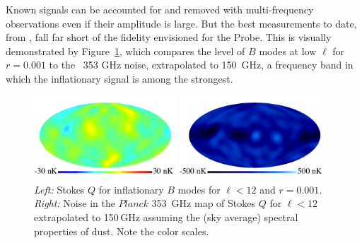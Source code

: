 Known signals can be accounted for and removed with multi-frequency observations even if their amplitude is large. 
But the best measurements to date, from \planck , fall far short of the fidelity envisioned for the Probe. 
This is visually demonstrated by Figure~\ref{fig:Qrp001}, which 
compares the level of $B$ modes at low $\ell$ for $r = 0.001$ to the \planck\ 353 GHz noise, 
extrapolated to 150~GHz, a frequency band in which the inflationary signal is among the strongest. 
\begin{figure}[ht!]
\hspace{.05in}
\parbox{2.in}{\centerline {
\includegraphics[width=2.1in]{Figures/P15_2_12_rp001.pdf} } }
\parbox{2.1in}{\centerline { 
\includegraphics[width=2.1in]{Figures/P353_N_2_12.pdf} } }
\hspace{0.in}
\parbox{2.2in} { 
\caption{ \footnotesize \setlength{\baselineskip}{0.95\baselineskip}
{\it Left:} Stokes $Q$ for inflationary $B$ modes for $\ell<12$ and $r=0.001$. 
 {\it Right:} Noise in the $Planck$ 353~GHz map of Stokes $Q$ for $\ell<12$ 
 extrapolated to 150\,GHz assuming the (sky average) spectral properties of dust. 
 Note the color scales.  
\label{fig:Qrp001}  }  }
\vspace{-0.05in}
\end{figure}


